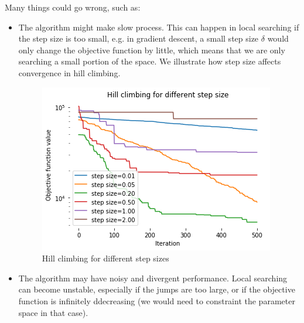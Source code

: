 \documentclass[a4paper, openany]{memoir}
\begin{document}
Many things could go wrong, such as:
\begin{itemize}
    \item The algorithm might make slow process. This can happen in local searching if the step size is too small, e.g. in gradient descent, a small step size $\delta$ would only change the objective function by little, which means that we are only searching a small portion of the space. We illustrate how step size affects convergence in hill climbing.
    \begin{figure}[H]
        \centering
        \includegraphics[scale=0.6]{src/4.22 hill climbing for different step size.png}
        \caption{Hill climbing for different step sizes}
    \end{figure}
    
    \item The algorithm may have noisy and divergent performance. Local searching can become unstable, especially if the jumps are too large, or if the objective function is infinitely ddecreasing (we would need to constraint the parameter space in that case).
    

\end{itemize}
\end{document}
